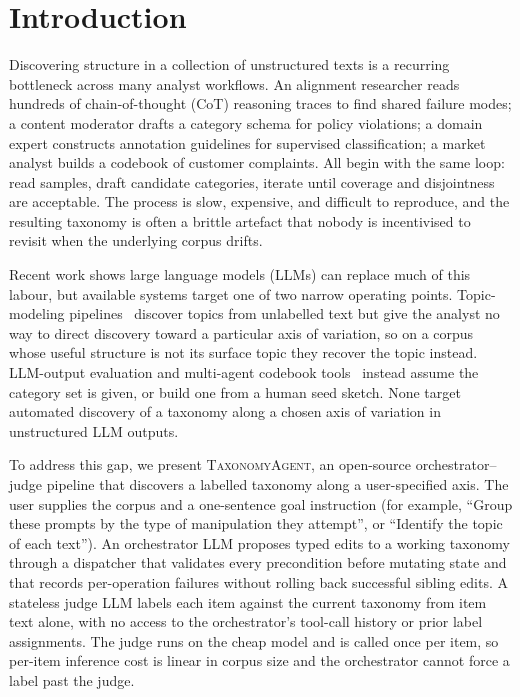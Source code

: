 \section{Introduction}
\label{sec:intro}

Discovering structure in a collection of unstructured texts is a
recurring bottleneck across many analyst workflows. An alignment
researcher reads hundreds of chain-of-thought (CoT) reasoning traces
to find shared failure modes; a content moderator drafts a category
schema for policy violations; a domain expert constructs annotation
guidelines for supervised classification; a market analyst builds a
codebook of customer complaints. All begin with the same loop: read
samples, draft candidate categories, iterate until coverage and
disjointness are acceptable. The process is slow, expensive, and
difficult to reproduce, and the resulting taxonomy is often a brittle
artefact that nobody is incentivised to revisit when the underlying
corpus drifts.

Recent work shows large language models (LLMs) can replace much of this
labour, but available systems target one of two narrow operating points.
Topic-modeling pipelines~\citep{pham2024topicgpt, wan2024tntllm} discover
topics from unlabelled text but give the analyst no way to direct
discovery toward a particular axis of variation, so on a corpus whose
useful structure is not its surface topic they recover the topic
instead. LLM-output evaluation and multi-agent codebook
tools~\citep{shen2026faithcot, chen2025reasoningmodels,
korbak2025cotmonitor, codetect2025, qiao2025thematiclm} instead assume
the category set is given, or build one from a human seed sketch. None
target automated discovery of a taxonomy along a chosen axis of
variation in unstructured LLM outputs.

To address this gap, we present \textsc{TaxonomyAgent}, an
open-source orchestrator--judge pipeline that discovers a labelled
taxonomy along a user-specified axis. The user supplies the corpus
and a one-sentence goal instruction (for example, ``Group these
prompts by the type of manipulation they attempt'', or ``Identify the
topic of each text''). An orchestrator LLM proposes typed edits to a
working taxonomy through a dispatcher that validates every
precondition before mutating state and that records per-operation
failures without rolling back successful sibling edits. A stateless
judge LLM labels each item against the current taxonomy from item
text alone, with no access to the orchestrator's tool-call history
or prior label assignments. The judge runs on the cheap model and is
called once per item, so per-item inference cost is linear in corpus
size and the orchestrator cannot force a label past the judge.

